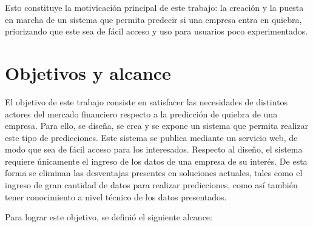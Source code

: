 Esto constituye la motivicación principal de este trabajo: la creación y la puesta en marcha de un sistema que permita predecir si una empresa entra en quiebra, priorizando que este sea de fácil acceso y uso para usuarios poco experimentados.


\section{Objetivos y alcance}

El objetivo de este trabajo consiste en satisfacer las necesidades de distintos actores del mercado financiero respecto a la predicción de quiebra de una empresa. Para ello, se diseña, se crea y se expone un sistema que permita realizar este tipo de predicciones. Este sistema se publica mediante un servicio web, de modo que sea de fácil acceso para los interesados. Respecto al diseño, el sistema requiere únicamente el ingreso de los datos de una empresa de su interés. De esta forma se eliminan las desventajas presentes en soluciones actuales, tales como el ingreso de gran cantidad de datos para realizar predicciones, como así también tener conocimiento a nivel técnico de los datos presentados.

Para lograr este objetivo, se definió el siguiente alcance:

